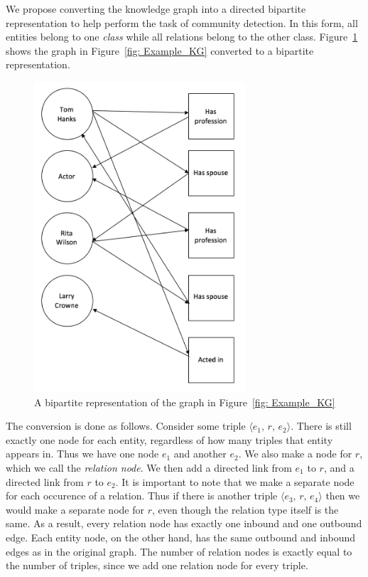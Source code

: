 \documentclass[12pt]{article}
\begin{document}
We propose converting the knowledge graph into a directed bipartite
representation to help perform the task of community detection. In this form,
all entities belong to one \textit{class} while all relations belong to the
other class. Figure~\ref{fig: Bipartite_KG} shows the graph in Figure~\ref{fig: Example_KG}
converted to a bipartite representation.

\begin{figure}
    \centering
    \includegraphics[width=0.7\textwidth,keepaspectratio]{figures/Bipartite_KG.png}
    \caption{A bipartite representation of the graph in Figure~\ref{fig: Example_KG} }
    \label{fig: Bipartite_KG}
\end{figure}

The conversion is done as follows. Consider some triple $\langle e_1,\,r,\,e_2
\rangle$. There is still exactly one node for each entity, regardless of how
many triples that entity appears in. Thus we have one node $e_1$ and another
$e_2$. We also make a node for $r$, which we call the \textit{relation node}. We
then add a directed link from $e_1$ to $r$, and a directed link from $r$ to
$e_2$. It is important to note that we make a separate node for each occurence
of a relation. Thus if there is another triple $\langle e_3,\,r,\,e_4 \rangle$
then we would make a separate node for $r$, even though the relation type itself
is the same. As a result, every relation node has exactly one inbound and one
outbound edge. Each entity node, on the other hand, has the same outbound and
inbound edges as in the original graph. The number of relation nodes is exactly
equal to the number of triples, since we add one relation node for every triple.
\end{document}
